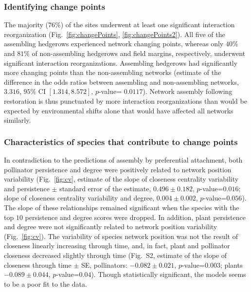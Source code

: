 \documentclass[12pt]{article}
\begin{document}
\subsubsection*{Identifying change points}

The majority ($76\%$) of the sites underwent at least one significant
interaction reorganization (Fig.~\ref{fig:changePoints},
\ref{fig:changePoints2}).  All five of the assembling hedgerows
experienced network changing points, whereas only $40\%$ and $81\%$ of
non-assembling hedgerows and field margins, respectively, underwent
significant interaction reorganizations. Assembling hedgerows had
significantly more changing points than the non-assembling networks
(estimate of the difference in the odds ratios between assembling and
non-assembling networks, $3.316$, $95\%$ CI $[1.314, 8.572]$,
$p$-value= $0.0117$). Network assembly following restoration is thus
punctuated by more interaction reorganizations than would be expected
by environmental shifts alone that would have affected all networks
similarly.

\subsubsection*{Characteristics of species that contribute to change
  points}

In contradiction to the predictions of assembly by preferential
attachment, both pollinator persistence and degree were positively
related to network position variability (Fig.~\ref{fig:cv}, estimate
of the slope of closeness centrality variability and persistence $\pm$
standard error of the estimate, $0.496 \pm 0.182$, $p$-value=$0.016$;
slope of closeness centrality variability and degree, $0.004 \pm
0.002$, $p$-value=$0.056$). The slope of these relationships remained
significant when the species with the top $10$ persistence and degree
scores were dropped. In addition, plant persistence and degree were
not significantly related to network position variability
(Fig.~\ref{fig:cv}). %
The variability of species network position was not the result of
closeness linearly increasing through time, and, in fact, plant and
pollinator closeness decreased slightly through time (Fig.~S2,
estimate of the slope of closeness through time $\pm$ SE, pollinators:
$-0.082 \pm 0.021$, $p$-value=$0.003$; plants $-0.089 \pm
0.044$, $p$-value=$0.04$). Though statistically significant,
the models seems to be a poor fit to the data. 
\end{document}
